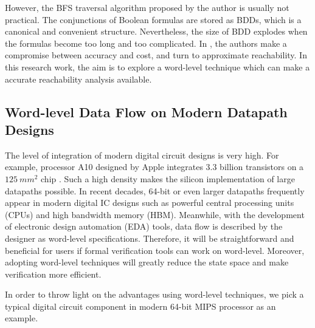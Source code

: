 However, the BFS traversal algorithm proposed by the author is usually not practical. The conjunctions of 
Boolean formulas are stored as BDDs, which is a canonical and convenient structure. Nevertheless, 
the size of BDD explodes when the formulas become too long and too complicated. In \cite{cho1993redundancy},
the authors make a compromise between accuracy and cost, and turn to approximate reachability. 
In this research work, the aim is to explore a word-level technique which can make a accurate reachability
analysis available.

\subsection{Word-level Data Flow on Modern Datapath Designs}
The level of integration of modern digital circuit designs is very high. For example, processor A10 designed by Apple
integrates 3.3 billion transistors on a $125~mm^2$ chip \cite{AppleA10}. Such a high density makes the silicon 
implementation of large datapaths possible. In recent decades, 64-bit or even larger datapaths frequently appear in 
modern digital IC designs such as powerful central processing units (CPUs) and high bandwidth memory (HBM).
Meanwhile, with the development of electronic design automation (EDA) tools, data flow 
is described by the designer as word-level specifications. Therefore, it will be straightforward 
and beneficial for users if formal verification tools can work on word-level. Moreover, adopting word-level 
techniques will greatly reduce the state space and make verification more efficient.

In order to throw light on the advantages using word-level techniques, we pick a typical 
digital circuit component in modern 64-bit MIPS processor as an example.

